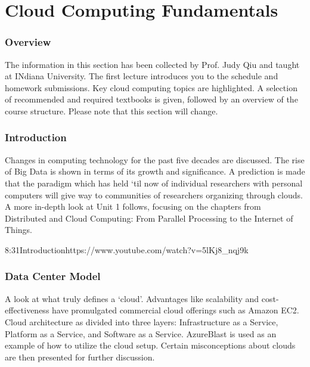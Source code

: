 \part{Cloud Computing Fundamentals}


\section{Overview}


The information in this section has been collected by Prof. Judy Qiu
and taught at INdiana University. The first lecture introduces you to the
schedule and homework submissions. Key cloud computing topics are
highlighted. A selection of recommended and required textbooks is given,
followed by an overview of the course structure. Please note that this
section will change.



\section{Introduction}

Changes in computing technology for the past five decades are discussed.
The rise of Big Data is shown in terms of its growth and significance. A
prediction is made that the paradigm which has held `til now of
individual researchers with personal computers will give way to
communities of researchers organizing through clouds. A more in-depth
look at Unit 1 follows, focusing on the chapters from Distributed and
Cloud Computing: From Parallel Processing to the Internet of Things.

  {8:31}{Introduction}{https://www.youtube.com/watch?v=5lKj8_nqj9k}


\section{Data Center Model}

A look at what truly defines a `cloud'. Advantages like scalability and
cost-effectiveness have promulgated commercial cloud offerings such as
Amazon EC2. Cloud architecture as divided into three layers:
Infrastructure as a Service, Platform as a Service, and Software as a
Service. AzureBlast is used as an example of how to utilize the cloud
setup. Certain misconceptions about clouds are then presented for
further discussion.

